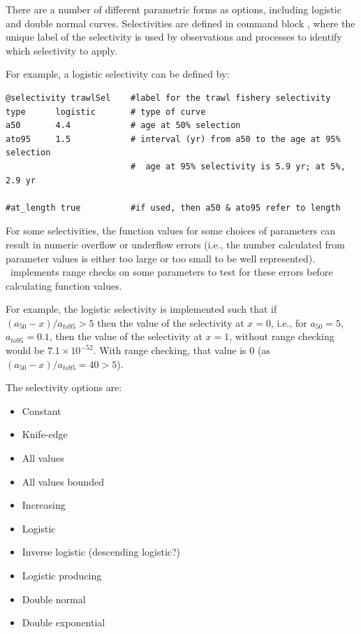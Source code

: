 There are a number of different parametric forms as options, including logistic and double normal curves. Selectivities are defined in command block , where the unique label of the selectivity is used by observations and processes to identify which selectivity to apply.

For example, a logistic selectivity can be defined by:

{\small{\begin{verbatim}
@selectivity trawlSel    #label for the trawl fishery selectivity
type      logistic       # type of curve
a50       4.4            # age at 50% selection
ato95     1.5            # interval (yr) from a50 to the age at 95% selection
                         #  age at 95% selectivity is 5.9 yr; at 5%, 2.9 yr

#at_length true          #if used, then a50 & ato95 refer to length
\end{verbatim}}}

For some selectivities, the function values for some choices of parameters can result in numeric overflow or underflow errors (i.e., the number calculated from parameter values is either too large or too small to be well represented). \CNAME\ implements range checks on some parameters to test for these errors before calculating function values.

For example, the logistic selectivity is implemented such that if $(a_{50}-x)/a_{to95} > 5$ then the value of the selectivity at $x=0$, i.e., for $a_{50}=5$, $a_{to95}=0.1$, then the value of the selectivity at $x=1$, without range checking would be $7.1 \times 10^{-52}$. With range checking, that value is $0$ (as $(a_{50}-x)/a_{to95}=40 > 5$).

The selectivity options are:

\begin{itemize}
  \item Constant
  \item Knife-edge
  \item All values
  \item All values bounded
  \item Increasing
  \item Logistic
  \item Inverse logistic (descending logistic?)
  \item Logistic producing
  \item Double normal
  \item Double exponential
\end{itemize}

